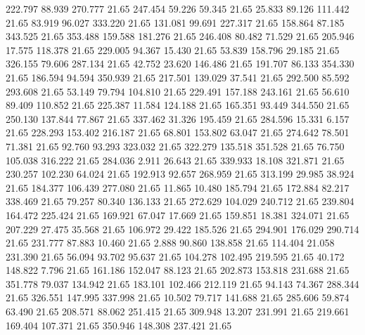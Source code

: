  222.797   88.939  270.777        21.65
 247.454   59.226   59.345        21.65
  25.833   89.126  111.442        21.65
  83.919   96.027  333.220        21.65
 131.081   99.691  227.317        21.65
 158.864   87.185  343.525        21.65
 353.488  159.588  181.276        21.65
 246.408   80.482   71.529        21.65
 205.946   17.575  118.378        21.65
 229.005   94.367   15.430        21.65
  53.839  158.796   29.185        21.65
 326.155   79.606  287.134        21.65
  42.752   23.620  146.486        21.65
 191.707   86.133  354.330        21.65
 186.594   94.594  350.939        21.65
 217.501  139.029   37.541        21.65
 292.500   85.592  293.608        21.65
  53.149   79.794  104.810        21.65
 229.491  157.188  243.161        21.65
  56.610   89.409  110.852        21.65
 225.387   11.584  124.188        21.65
 165.351   93.449  344.550        21.65
 250.130  137.844   77.867        21.65
 337.462   31.326  195.459        21.65
 284.596   15.331    6.157        21.65
 228.293  153.402  216.187        21.65
  68.801  153.802   63.047        21.65
 274.642   78.501   71.381        21.65
  92.760   93.293  323.032        21.65
 322.279  135.518  351.528        21.65
  76.750  105.038  316.222        21.65
 284.036    2.911   26.643        21.65
 339.933   18.108  321.871        21.65
 230.257  102.230   64.024        21.65
 192.913   92.657  268.959        21.65
 313.199   29.985   38.924        21.65
 184.377  106.439  277.080        21.65
  11.865   10.480  185.794        21.65
 172.884   82.217  338.469        21.65
  79.257   80.340  136.133        21.65
 272.629  104.029  240.712        21.65
 239.804  164.472  225.424        21.65
 169.921   67.047   17.669        21.65
 159.851   18.381  324.071        21.65
 207.229   27.475   35.568        21.65
 106.972   29.422  185.526        21.65
 294.901  176.029  290.714        21.65
 231.777   87.883   10.460        21.65
   2.888   90.860  138.858        21.65
 114.404   21.058  231.390        21.65
  56.094   93.702   95.637        21.65
 104.278  102.495  219.595        21.65
  40.172  148.822    7.796        21.65
 161.186  152.047   88.123        21.65
 202.873  153.818  231.688        21.65
 351.778   79.037  134.942        21.65
 183.101  102.466  212.119        21.65
  94.143   74.367  288.344        21.65
 326.551  147.995  337.998        21.65
  10.502   79.717  141.688        21.65
 285.606   59.874   63.490        21.65
 208.571   88.062  251.415        21.65
 309.948   13.207  231.991        21.65
 219.661  169.404  107.371        21.65
 350.946  148.308  237.421        21.65
